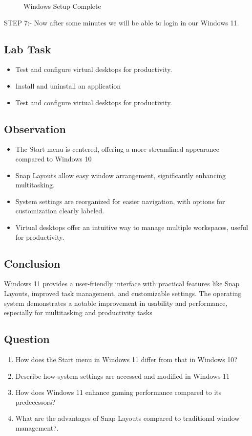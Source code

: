 \documentclass[a4paper,9pt]{article}
\begin{document}
\begin{enumerate}
\begin{figure}[H]
			\caption{Windows Setup Complete}
		\end{figure}
	   STEP 7:-	Now after some minutes we will be able to login in  our Windows 11.
	\end{enumerate}
	
	\subsection{Lab Task}
	
	\begin{itemize}
		\item Test and configure virtual desktops for productivity.
		\item Install and uninstall an application
		\item Test and configure virtual desktops for productivity.
		 
	\end{itemize}
	
	\subsection{Observation}
	\begin{itemize}
		\item The Start menu is centered, offering a more streamlined appearance compared to Windows 10
		\item Snap Layouts allow easy window arrangement, significantly enhancing multitasking.
		\item System settings are reorganized for easier navigation, with options for customization clearly labeled.
		\item Virtual desktops offer an intuitive way to manage multiple workspaces, useful for productivity.
	\end{itemize}
	\subsection{Conclusion}
		Windows 11 provides a user-friendly interface with practical features like Snap Layouts, improved task management, and customizable settings. The operating system demonstrates a notable improvement in usability and performance, especially for multitasking and productivity tasks
	
	\subsection{Question}
	
	\begin{enumerate}
		\item How does the Start menu in Windows 11 differ from that in Windows 10?
		\item Describe how system settings are accessed and modified in Windows 11 
		\item How does Windows 11 enhance gaming performance compared to its predecessors?
		\item What are the advantages of Snap Layouts compared to traditional window management?.
		
	\end{enumerate}
	
\end{document}
